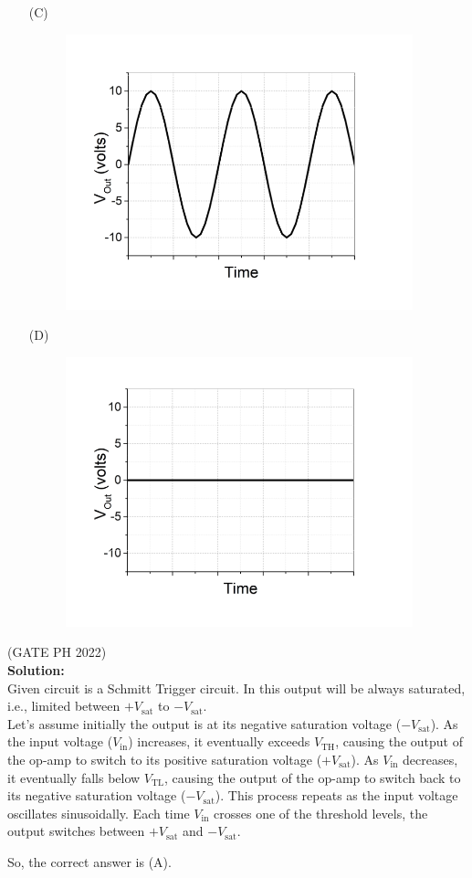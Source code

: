 \documentclass[journal,12pt,twocolumn]{IEEEtran}
\begin{document}
\begin{enumerate}
  \item[(C)]
  \setcounter{figure}{2}
    \begin{figure}[h]
        \centering
        \includegraphics[width=0.8\linewidth]{figs/3.png}
        \label{fig:avv_label}
    \end{figure}
    
  \item[(D)]
  \setcounter{figure}{3}
    \begin{figure}[h]
        \centering
        \includegraphics[width=0.8\linewidth]{figs/4.png}
        \label{fig:abb_label}
    \end{figure}
\end{enumerate}

\hfill{(GATE PH 2022)}\\
\textbf{Solution:} \\
Given circuit is a Schmitt Trigger circuit. In this output will be always saturated, i.e., limited between \( +V_{\text{sat}} \) to \( -V_{\text{sat}} \).\\
Let's assume initially the output is at its negative saturation voltage (\(-V_{\text{sat}}\)). 
As the input voltage (\(V_{\text{in}}\)) increases, it eventually exceeds \(V_{\text{TH}}\), causing the output of the op-amp to switch to its positive saturation voltage (\(+V_{\text{sat}}\)).
As \(V_{\text{in}}\) decreases, it eventually falls below \(V_{\text{TL}}\), causing the output of the op-amp to switch back to its negative saturation voltage (\(-V_{\text{sat}}\)). 
This process repeats as the input voltage oscillates sinusoidally. Each time \(V_{\text{in}}\) crosses one of the threshold levels, the output switches between \(+V_{\text{sat}}\) and \(-V_{\text{sat}}\).

So, the correct answer is (A).
\end{document}
